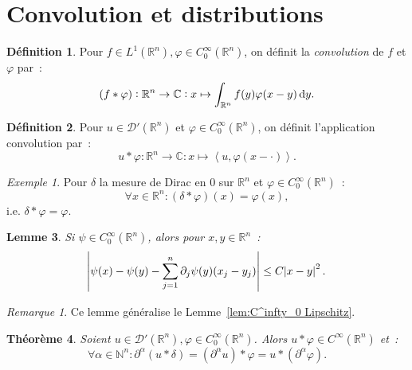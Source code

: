 \documentclass{report}
\newcommand{\C}{{\mathbb C}}
\newcommand{\R}{{\mathbb R}}
\newcommand{\N}{{\mathbb N}}
\newcommand{\scpr}[2]{\left\langle#1, #2\right\rangle}
\newtheorem{thm}{Théorème}[chapter]
\newtheorem{lem}[thm]{Lemme}
\theoremstyle{definition}
\newtheorem{déf}[thm]{Définition}
\theoremstyle{remark}
\newtheorem*{rmq}{Remarque}
\newtheorem{ex}{Exemple}[chapter]
\begin{document}
\section{Convolution et distributions}

\begin{déf} Pour $f \in L^1(\R^n), \varphi \in C^\infty_0(\R^n)$, on définit la \textit{convolution} de $f$ et $\varphi$ par~:
\[(f * \varphi) : \R^n \to \C : x \mapsto \int_{\R^n}f(y)\varphi(x-y)\dif y.\]
\end{déf}

\begin{déf} Pour $u \in \mathcal D'(\R^n)$ et $\varphi \in C^\infty_0(\R^n)$, on définit l'application convolution par~:
\[u*\varphi : \R^n \to \C : x \mapsto \scpr u{\varphi(x-\cdot)}.\]
\end{déf}

\begin{ex} Pour $\delta$ la mesure de Dirac en 0 sur $\R^n$ et $\varphi \in C^\infty_0(\R^n)$~:
\[\forall x \in \R^n : (\delta * \varphi)(x) = \varphi(x),\]
i.e. $\delta * \varphi = \varphi$.
\end{ex}

\begin{lem}\label{lem:C^infty_0 Lipschitz^2} Si $\psi \in C^\infty_0(\R^n)$, alors pour $x, y \in \R^n$~:
\[\abs {\psi(x) - \psi(y) - \sum_{j=1}^n\partial_j\psi(y)(x_j-y_j)} \leq C\abs {x-y}^2.\]
\end{lem}

\begin{rmq} Ce lemme généralise le Lemme~\ref{lem:C^infty_0 Lipschitz}.
\end{rmq}

\begin{thm} Soient $u \in \mathcal D'(\R^n), \varphi \in C^\infty_0(\R^n)$. Alors $u * \varphi \in C^\infty(\R^n)$ et~:
\[\forall \alpha \in \N^n : \partial^\alpha(u * \delta) = (\partial^\alpha u) * \varphi = u * (\partial^\alpha\varphi).\]
\end{thm}
\end{document}
